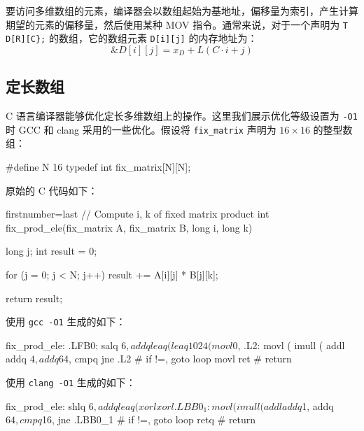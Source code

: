要访问多维数组的元素，编译器会以数组起始为基地址，偏移量为索引，产生计算期望的元素的偏移量，然后使用某种 MOV 指令。通常来说，对于一个声明为 \verb|T D[R][C};| 的数组，它的数组元素 \verb|D[i][j]| 的内存地址为：
\begin{equation}
    \&D[i][j] = x_D + L(C \cdot i + j)
    \label{def:2darray_addr}
\end{equation}

\subsection{定长数组}

C 语言编译器能够优化定长多维数组上的操作。这里我们展示优化等级设置为 \verb|-O1| 时 GCC 和 clang 采用的一些优化。假设将 \verb|fix_matrix| 声明为 $16 \times 16$ 的整型数组：
\begin{cppcode}
#define N 16
typedef int fix_matrix[N][N];
\end{cppcode}

原始的 C 代码如下：
\begin{cppcode*}{firstnumber=last}
// Compute i, k of fixed matrix product
int fix_prod_ele(fix_matrix A, fix_matrix B, long i, long k) {
  long j;
  int result = 0;

  for (j = 0; j < N; j++)
    result += A[i][j] * B[j][k];

  return result;
}
\end{cppcode*}

使用 \verb|gcc -O1| 生成的如下：
\begin{gascode}
fix_prod_ele:
.LFB0:
    salq    $6, %
    addq    %
    leaq    (%
    leaq    1024(%
    movl    $0, %
.L2:
    movl    (%
    imull   (%
    addl    %
    addq    $4, %
    addq    $64, %
    cmpq    %
    jne     .L2                 # if !=, goto loop
    movl    %
    ret                         # return
\end{gascode}

使用 \verb|clang -O1| 生成的如下：
\begin{gascode}
fix_prod_ele:
    shlq    $6, %
    addq    %
    leaq    (%
    xorl    %
    xorl    %
.LBB0_1:
    movl    (%
    imull   (%
    addl    %
    addq    $1, %
    addq    $64, %
    cmpq    $16, %
    jne     .LBB0_1             # if !=, goto loop
    retq                        # return
\end{gascode}

